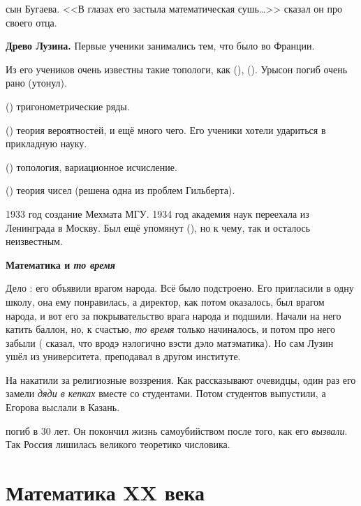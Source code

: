 \documentclass[a4paper,oneside,fleqn,10pt]{article}
\begin{document}
 сын Бугаева.  <<В глазах его
застыла математическая сушь\ldots>> сказал он про своего отца.

\textbf{Древо Лузина.}  Первые ученики 
занимались тем, что было во Франции.

Из его учеников очень известны такие топологи, как
 (), 
().  Урысон погиб очень рано (утонул).

 () тригонометрические ряды.

 () теория вероятностей, и ещё
много чего.  Его ученики хотели удариться в прикладную науку.

 () топология, вариационное
исчисление.

 () теория чисел (решена одна из
проблем Гильберта).

1933 год создание Мехмата МГУ. 1934 год академия наук переехала из
Ленинграда в Москву.  Был ещё упомянут 
(), но к чему, так и осталось неизвестным.

\textbf{Математика и \emph{то время}}

Дело : его объявили врагом народа. Всё было
подстроено.  Его пригласили в одну школу, она ему понравилась, а
директор, как потом оказалось, был врагом народа, и вот его за
покрывательство врага народа и подшили.  Начали на него катить баллон,
но, к счастью, \emph{то время} только начиналось, и потом про него
забыли ( сказал, что вродэ нэлогично вэсти дэло
матэматика). Но сам Лузин ушёл из университета, преподавал в другом
институте.

На  накатили за религиозные воззрения. Как
рассказывают очевидцы, один раз его замели \emph{дяди в кепках} вместе
со студентами. Потом студентов выпустили, а Егорова выслали в Казань.

 погиб в 30 лет. Он покончил жизнь самоубийством
после того, как его \emph{вызвали}.  Так Россия лишилась великого
теоретико числовика.



\section{Математика XX века}
\end{document}
